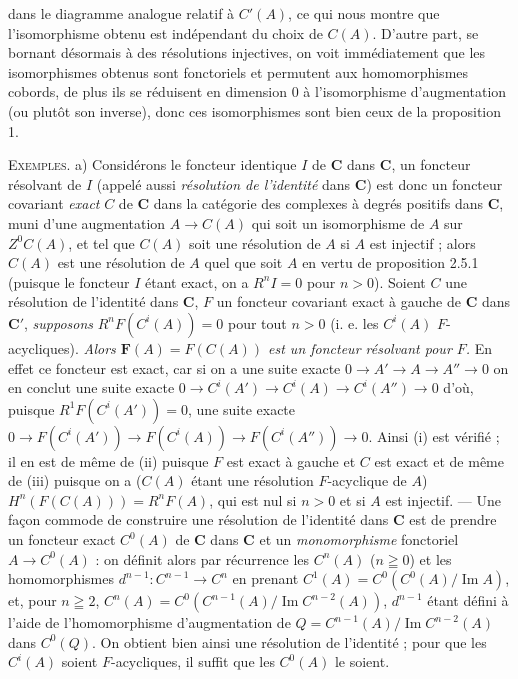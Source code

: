 
\noindent dans le diagramme analogue relatif à $C'(A)$, ce qui nous montre
que l'isomorphisme obtenu est indépendant du choix de $C(A)$. D'autre part,
se bornant désormais à des résolutions injectives, on voit immédiatement que
les isomorphismes obtenus sont fonctoriels et permutent aux homomorphismes
cobords, de plus ils se réduisent en dimension 0 à l'isomorphisme
d'augmentation (ou plutôt son inverse), donc ces isomorphismes sont bien ceux
de la proposition 1.

\textsc{Exemples.} a) Considérons le foncteur identique $I$ de $\mathbf{C}$
dans $\mathbf{C}$, un foncteur résolvant de $I$ (appelé aussi \textit{résolution de
l'identité} dans $\mathbf{C}$) est donc un foncteur covariant \textit{exact} $C$ de $\mathbf{C}$
dans la catégorie des complexes à degrés positifs dans $\mathbf{C}$, muni d'une
augmentation $A\to C(A)$ qui soit un isomorphisme de $A$ sur
$Z^0C(A)$, et tel que $C(A)$ soit une résolution de $A$ si $A$ est injectif ;
alors $C(A)$ est une résolution de $A$ quel que soit $A$ en vertu de
proposition 2.5.1 (puisque le foncteur $I$ étant exact, on a $R^nI=0$ pour
$n>0$). Soient $C$ une résolution de l'identité dans $\mathbf{C}$, $F$ un
foncteur covariant exact à gauche de $\mathbf{C}$ dans $\mathbf{C}'$, \textit{supposons}
$R^nF(C^i(A))=0$ pour tout $n>0$ (i. e. les $C^i(A)$ $F$-acycliques).
\textit{Alors $\mathbf F(A)=F(C(A))$ est un foncteur résolvant pour $F$.} En
effet ce foncteur est exact, car si on a une suite exacte
$0\to A'\to A\to A''\to0$
on en conclut une suite exacte
$0\to C^i(A')\to C^i(A)\to
C^i(A'')\to0$ d'où, puisque $R^1F(C^i(A'))=0$, une suite exacte
$0\to F(C^i(A'))\to F(C^i(A))
\to F(C^i(A''))\to0$.
Ainsi (i) est vérifié ; il en est de même de (ii) puisque $F$ est exact à
gauche et $C$ est exact et de même de (iii) puisque on a ($C(A)$
étant une résolution $F$-acyclique de $A$)
$H^n(F(C(A)))=R^nF(A)$, qui est nul si $n>0$ et si $A$ est injectif. --- Une façon
commode de construire une résolution de l'identité dans $\mathbf{C}$ est de prendre un
foncteur exact $C^0(A)$ de $\mathbf{C}$ dans $\mathbf{C}$ et un \textit{monomorphisme} fonctoriel
$A\to C^0(A)$ : on définit alors par récurrence les $C^n(A)$
($n\geqq0$) et les homomorphismes $d^{n-1}:C^{n-1}\to C^n$ en
prenant
$C^1(A)=C^0(C^0(A)/\operatorname{Im}A)$,
et, pour $n\geqq2$,
$C^n(A)=C^0(C^{n-1}(A)/\operatorname{Im}C^{n-2}(A))$,
$d^{n-1}$ étant défini à l'aide de l'homomorphisme d'augmentation de
$Q=C^{n-1}(A)/\operatorname{Im}C^{n-2}(A)$ dans $C^0(Q)$. On obtient bien
ainsi une résolution de l'identité ; pour que les $C^i(A)$ soient
$F$-acycliques, il suffit que les $C^0(A)$ le soient.

